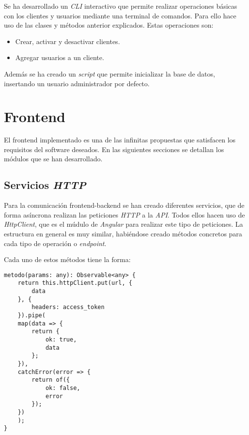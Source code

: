 Se ha desarrollado un \textit{CLI} interactivo que permite realizar operaciones básicas con los clientes y usuarios mediante una terminal de comandos. Para ello hace uso de las clases y métodos anterior explicados. Estas operaciones son:
\begin{itemize}
	\item Crear, activar y desactivar clientes.
	\item Agregar usuarios a un cliente.
\end{itemize}


Además se ha creado un \textit{script} que permite inicializar la base de datos, insertando un usuario administrador por defecto.





\section{Frontend}
\label{711}

El frontend implementado es una de las infinitas propuestas que satisfacen los requisitos del software deseados. En las siguientes secciones se detallan los módulos que se han desarrollado.



\subsection{Servicios \textit{HTTP}}


Para la comunicación frontend-backend se han creado diferentes servicios, que de forma asíncrona realizan las peticiones \textit{HTTP} a la \textit{API}. Todos ellos hacen uso de \textit{HttpClient}, que es el múdulo de \textit{Angular} para realizar este tipo de peticiones. La estructura en general es muy similar, habiéndose creado métodos concretos para cada tipo de operación o \textit{endpoint}.

\pagebreak
Cada uno de estos métodos tiene la forma:

\begin{lstlisting}
metodo(params: any): Observable<any> {
	return this.httpClient.put(url, {
		data
	}, {
		headers: access_token
	}).pipe(
	map(data => {
		return {
			ok: true,
			data
		};
	}),
	catchError(error => {
		return of({
			ok: false,
			error
		});
	})
	);
}
\end{lstlisting}

